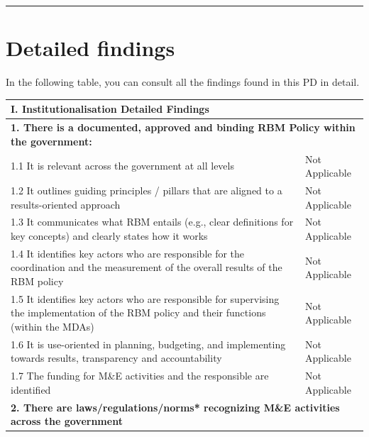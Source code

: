 \documentclass[
  10pt,
]{book}
\begin{document}
\begin{center}\rule{0.5\linewidth}{0.5pt}\end{center}

\hypertarget{appendixB}{%
\chapter{Detailed findings}\label{appendixB}}

In the following table, you can consult all the findings found in this PD in detail.

\begin{table}
\centering
\begin{tabular}[t]{l|l}
\hline
I. Institutionalisation Detailed Findings &  \\
\hline
\multicolumn{2}{l}{\textbf{1. There is a documented, approved and binding RBM Policy within the government:}}\\
\hline
\hspace{1em}1.1 It is relevant across the government at all levels & Not Applicable\\
\hline
\hspace{1em}1.2 It outlines guiding principles / pillars that are aligned to a results-oriented approach & Not Applicable\\
\hline
\hspace{1em}1.3 It communicates what RBM entails (e.g., clear definitions for key concepts) and clearly states how it works & Not Applicable\\
\hline
\hspace{1em}1.4 It identifies key actors who are responsible for the coordination and the measurement of the overall results of the RBM policy & Not Applicable\\
\hline
\hspace{1em}1.5 It identifies key actors who are responsible for supervising the implementation of the RBM policy and their functions (within the MDAs) & Not Applicable\\
\hline
\hspace{1em}1.6 It is use-oriented in planning, budgeting, and implementing towards results, transparency and accountability & Not Applicable\\
\hline
\hspace{1em}1.7 The funding for M\&E activities and the responsible are identified & Not Applicable\\
\hline
\multicolumn{2}{l}{\textbf{2. There are laws/regulations/norms* recognizing M\&E activities across the government}}\\

\end{tabular}
\end{table}
\end{document}
